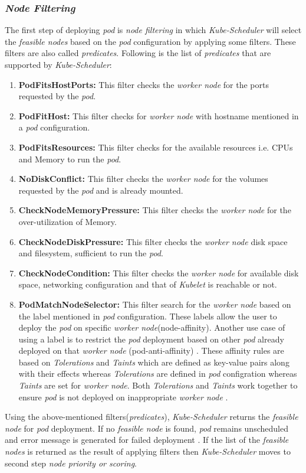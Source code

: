 \subsubsection{\emph{Node Filtering}}
\label{sec:node-filter}
The first step of deploying \emph{pod} is \emph{node filtering} in which \emph{Kube-Scheduler} will select the \emph{feasible nodes} based on the \emph{pod} configuration by applying some filters\cite{Santos2019}. These filters are also called \emph{predicates}. Following is the list of \emph{predicates} that are supported by \emph{Kube-Scheduler}\cite{k8s}:
\begin{enumerate}
  \item \textbf{PodFitsHostPorts:} This filter checks the \emph{worker node} for the ports requested by the \emph{pod}.
  \item \textbf{PodFitHost:} This filter checks for \emph{worker node} with hostname mentioned in a \emph{pod} configuration.
  \item \textbf{PodFitsResources:} This filter checks for the available resources i.e. CPUs and Memory to run the \emph{pod}.
  \item \textbf{NoDiskConflict:} This filter checks the \emph{worker node} for the volumes requested by the \emph{pod} and is already mounted.
  \item \textbf{CheckNodeMemoryPressure:} This filter checks the \emph{worker node} for the over-utilization of Memory.
  \item \textbf{CheckNodeDiskPressure:} This filter checks the \emph{worker node} disk space and filesystem, sufficient to run the \emph{pod}.
  \item \textbf{CheckNodeCondition:} This filter checks the \emph{worker node} for available disk space, networking configuration and that of \emph{Kubelet} is reachable or not.
  \item \textbf{PodMatchNodeSelector:} This filter search for the \emph{worker node} based on the label mentioned in \emph{pod} configuration. These labels allow the user to deploy the \emph{pod} on specific \emph{worker node}(node-affinity)\cite{Santos2019}. Another use case of using a label is to restrict the \emph{pod} deployment based on other \emph{pod} already deployed on that \emph{worker node} (pod-anti-affinity) \cite{Santos2019}. These affinity rules are based on \emph{Tolerations} and \emph{Taints} which are defined as key-value pairs along with their effects whereas \emph{Tolerations} are defined in \emph{pod} configration whereas \emph{Taints} are set for \emph{worker node}\cite{k8s}. Both \emph{Tolerations} and \emph{Taints} work together to ensure \emph{pod} is not deployed on inappropriate \emph{worker node} \cite{k8s}.
\end{enumerate}
Using the above-mentioned filters(\emph{predicates}), \emph{Kube-Scheduler} returns the \emph{feasible node} for \emph{pod} deployment. If no \emph{feasible node} is found, \emph{pod} remains unscheduled and error message is generated for failed deployment \cite{Santos2019}. If the list of the \emph{feasible nodes} is returned as the result of applying filters then \emph{Kube-Scheduler} moves to second step \emph{node priority or scoring}.
